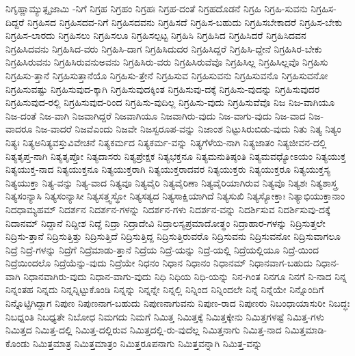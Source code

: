 {ನಿಗೃಹ್ಣಾಮ್ಯುತ್ಸೃಜಾಮಿ
-ನಿಗೆ
ನಿಗ್ರಹ
ನಿಗ್ರಹಂ
ನಿಗ್ರಹಃ
ನಿಗ್ರಹ-ದಂತೆ
ನಿಗ್ರಹದೊಡನೆ
ನಿಗ್ರಹಿ
ನಿಗ್ರಹಿ-ಸುವನು
ನಿಗ್ರಹಿಸ-ದಿದ್ದರೆ
ನಿಗ್ರಹಿಸದ
ನಿಗ್ರಹಿಸದವ-ನಿಗೆ
ನಿಗ್ರಹಿಸದವನು
ನಿಗ್ರಹಿಸದೆ
ನಿಗ್ರಹಿಸ-ಬಹುದು
ನಿಗ್ರಹಿಸಬೇಕಾದರೆ
ನಿಗ್ರಹಿಸ-ಬೇಕು
ನಿಗ್ರಹಿಸ-ಲಾರದು
ನಿಗ್ರಹಿಸಲು
ನಿಗ್ರಹಿಸಲೂ
ನಿಗ್ರಹಿಸಲ್ಪಟ್ಟ
ನಿಗ್ರಹಿಸಿ
ನಿಗ್ರಹಿಸಿದ
ನಿಗ್ರಹಿಸಿದರೆ
ನಿಗ್ರಹಿಸಿದವನ
ನಿಗ್ರಹಿಸಿದವನು
ನಿಗ್ರಹಿಸಿದ-ವರು
ನಿಗ್ರಹಿಸಿ-ದಾಗ
ನಿಗ್ರಹಿಸಿದುದರ
ನಿಗ್ರಹಿಸಿದ್ದರೆ
ನಿಗ್ರಹಿಸಿ-ದ್ದೇನೆ
ನಿಗ್ರಹಿಸಿರ-ಬೇಕು
ನಿಗ್ರಹಿಸಿರುವನು
ನಿಗ್ರಹಿಸಿರುವನುಅವನು
ನಿಗ್ರಹಿಸಿರು-ವರು
ನಿಗ್ರಹಿಸಿರುವೆವೊ
ನಿಗ್ರಹಿಸಿಲ್ಲ
ನಿಗ್ರಹಿಸಿಲ್ಲವೊ
ನಿಗ್ರಹಿಸು
ನಿಗ್ರಹಿಸು-ತ್ತಾನೆ
ನಿಗ್ರಹಿಸುತ್ತಾನೆಯೊ
ನಿಗ್ರಹಿಸು-ತ್ತೇನೆ
ನಿಗ್ರಹಿಸುವ
ನಿಗ್ರಹಿಸುವನು
ನಿಗ್ರಹಿಸುವನೊ
ನಿಗ್ರಹಿಸುವನೋ
ನಿಗ್ರಹಿಸುವಷ್ಟು
ನಿಗ್ರಹಿಸುವುದ-ಕ್ಕಾಗಿ
ನಿಗ್ರಹಿಸುವುದಕ್ಕಿಂತ
ನಿಗ್ರಹಿಸುವು-ದಕ್ಕೆ
ನಿಗ್ರಹಿಸು-ವುದನ್ನು
ನಿಗ್ರಹಿಸುವುದರ
ನಿಗ್ರಹಿಸುವುದ-ರಲ್ಲಿ
ನಿಗ್ರಹಿಸುವುದ-ರಿಂದ
ನಿಗ್ರಹಿಸು-ವುದಿಲ್ಲ
ನಿಗ್ರಹಿಸು-ವುದು
ನಿಗ್ರಹಿಸುವೆವೊ
ನಿಜ
ನಿಜ-ವಾಗಿಯೂ
ನಿಜ-ದಂತೆ
ನಿಜ-ವಾಗಿ
ನಿಜವಾಗಿದ್ದರೆ
ನಿಜವಾಗಿಯೂ
ನಿಜವಾಗಿರು-ವುದು
ನಿಜ-ವಾಗು-ವುದು
ನಿಜ-ವಾದ
ನಿಜ-ವಾದರೂ
ನಿಜ-ವಾದರೆ
ನಿಜವೆಎಂದು
ನಿಜವೇ
ನಿಜಸ್ವರೂಪ-ವನ್ನು
ನಿಜಾಂಶ
ನಿಟ್ಟುಸಿರುಬಿಡು-ವುದು
ನಿತು
ನಿತ್ಯ
ನಿತ್ಯಂ
ನಿತ್ಯಃ
ನಿತ್ಯಅನಿತ್ಯವಸ್ತುವಿವೇಚನೆ
ನಿತ್ಯಕರ್ಮದ
ನಿತ್ಯಕರ್ಮ-ವನ್ನು
ನಿತ್ಯಗೆಳೆಯ-ನಾಗಿ
ನಿತ್ಯಜಾತಂ
ನಿತ್ಯಜೀವನ-ದಲ್ಲಿ
ನಿತ್ಯತೃಪ್ತ-ನಾಗಿ
ನಿತ್ಯತೃಪ್ತೋ
ನಿತ್ಯದಾಸರು
ನಿತ್ಯಪ್ರೇಕ್ಷಕ
ನಿತ್ಯಭಕ್ತನೂ
ನಿತ್ಯಮನುತಿಷ್ಠಂತಿ
ನಿತ್ಯಮವಧ್ಯೋಽಯಂ
ನಿತ್ಯಯುಕ್ತ
ನಿತ್ಯಯುಕ್ತ-ನಾದ
ನಿತ್ಯಯುಕ್ತನೂ
ನಿತ್ಯಯುಕ್ತರಾಗಿ
ನಿತ್ಯಯುಕ್ತರಾದವರ
ನಿತ್ಯಯುಕ್ತರು
ನಿತ್ಯಯುಕ್ತರೂ
ನಿತ್ಯಯುಕ್ತಸ್ಯ
ನಿತ್ಯಯುಕ್ತಾ
ನಿತ್ಯ-ವನ್ನು
ನಿತ್ಯ-ವಾದ
ನಿತ್ಯವೂ
ನಿತ್ಯವೈರಿ
ನಿತ್ಯವೈರಿಣಾ
ನಿತ್ಯವೈರಿಯಾಗಿರುವ
ನಿತ್ಯವೊ
ನಿತ್ಯಶಃ
ನಿತ್ಯಶಾಸ್ತ್ರ
ನಿತ್ಯಸಂನ್ಯಾಸಿ
ನಿತ್ಯಸಂನ್ಯಾಸೀ
ನಿತ್ಯಸತ್ತ್ವಸ್ಥೋ
ನಿತ್ಯಸತ್ಯದ
ನಿತ್ಯಸಾಕ್ಷಿಯಾಗಿದೆ
ನಿತ್ಯಸುಖಿ
ನಿತ್ಯಸ್ಯೋಕ್ತಾಃ
ನಿತ್ಯಾಭಿಯುಕ್ತಾನಾಂ
ನಿದಧಾಮ್ಯಹಮ್
ನಿದರ್ಶನ
ನಿದರ್ಶನ-ಗಳನ್ನು
ನಿದರ್ಶನ-ಗಳು
ನಿದರ್ಶನ-ವನ್ನು
ನಿದರ್ಶಿಸುವ
ನಿದರ್ಶಿಸುವು-ದಕ್ಕೆ
ನಿದಾನಮ್
ನಿದ್ದಾನೆ
ನಿದ್ದೀಶ
ನಿದ್ದೆ
ನಿದ್ರಾ
ನಿದ್ರಾದೇವಿ
ನಿದ್ರಾಲಸ್ಯಪ್ರಮಾದೋತ್ಥಂ
ನಿದ್ರಾಹಾರ-ಗಳನ್ನು
ನಿದ್ರಿಸುತ್ತಲೇ
ನಿದ್ರಿಸು-ತ್ತಾನೆ
ನಿದ್ರಿಸುತ್ತಿತ್ತು
ನಿದ್ರಿಸುತ್ತಿದೆ
ನಿದ್ರಿಸುತ್ತಿದ್ದ
ನಿದ್ರಿಸುತ್ತಿರುವರೊ
ನಿದ್ರಿಸುವನು
ನಿದ್ರಿಸುವನೋ
ನಿದ್ರಿಸುವಾಗಲೂ
ನಿದ್ರೆ
ನಿದ್ರೆ-ಗಳನ್ನು
ನಿದ್ರೆಗೆ
ನಿದ್ರೆಮಾಡು-ತ್ತಾನೆ
ನಿದ್ರೆಯ
ನಿದ್ರೆ-ಯನ್ನು
ನಿದ್ರೆ-ಯಲ್ಲಿ
ನಿದ್ರೆಯಲ್ಲಿಯೂ
ನಿದ್ರೆ-ಯಿಂದ
ನಿದ್ರೆಯಿಂದಲೊ
ನಿದ್ರೆಯೆನ್ನು-ವುದು
ನಿದ್ರೆಯೇ
ನಿಧನಂ
ನಿಧಾನ
ನಿಧಾನಂ
ನಿಧಾನಮ್
ನಿಧಾನವಾಗ-ಬಹುದು
ನಿಧಾನ-ವಾಗಿ
ನಿಧಾನವಾಗಿರು-ವುದು
ನಿಧಾನ-ವಾಗು-ವುದು
ನಿಧಿ
ನಿಧಿಯ
ನಿಧಿ-ಯನ್ನು
ನಿನ-ಗಿಂತ
ನಿನಗೂ
ನಿನಗೆ
ನಿ-ನಾದ
ನಿನ್ನ
ನಿನ್ನಂತಹ
ನಿನ್ನದು
ನಿನ್ನನ್ನಿಟ್ಟುಕೊಂಡಿ
ನಿನ್ನನ್ನು
ನಿನ್ನನ್ನೇ
ನಿನ್ನಲ್ಲಿ
ನಿನ್ನಿಂದ
ನಿನ್ನಿಂದಲೇ
ನಿನ್ನೆ
ನಿನ್ನೆಯೇ
ನಿನ್ನೊಂದಿಗೆ
ನಿನ್ನೊಟ್ಟಿಗಿದ್ದಾಗ
ನಿಪುಣ
ನಿಪುಣನಾಗ-ಬಹುದು
ನಿಪುಣನಾಗುವನು
ನಿಪುಣ-ರಾದ
ನಿಪುಣರು
ನಿಬಂಧಾಯಾಸುರೀ
ನಿಬದ್ಧಃ
ನಿಬಧ್ನಂತಿ
ನಿಬಧ್ಯತೇ
ನಿಬೋಧ
ನಿಮಗದು
ನಿಮಗೆ
ನಿಮಿತ್ತ
ನಿಮಿತ್ತಕ್ಕೆ
ನಿಮಿತ್ತಕ್ಕೇನು
ನಿಮಿತ್ತಗಳಷ್ಟೆ
ನಿಮಿತ್ತ-ಗಳು
ನಿಮಿತ್ತದ
ನಿಮಿತ್ತ-ದಲ್ಲಿ
ನಿಮಿತ್ತ-ದಲ್ಲಿರುವ
ನಿಮಿತ್ತದಲ್ಲಿ-ರು-ವುದೆಲ್ಲ
ನಿಮಿತ್ತನಾಗು
ನಿಮಿತ್ತ-ನಾದ
ನಿಮಿತ್ತಮಾಡಿ-ಕೊಂಡು
ನಿಮಿತ್ತಮಾತ್ರ
ನಿಮಿತ್ತಮಾತ್ರಂ
ನಿಮಿತ್ತರೂಪನಾಗು
ನಿಮಿತ್ತವನ್ನಾಗಿ
ನಿಮಿತ್ತ-ವನ್ನು
}
